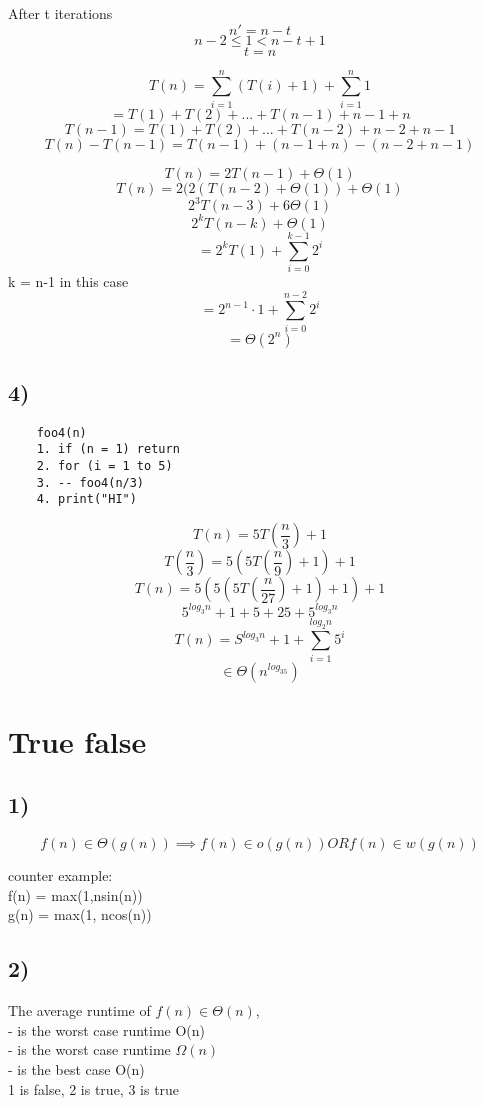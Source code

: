 \documentclass[12pt]{article}
\begin{document}
	After t iterations\\
	$$n' = n-t$$
	$$n-2 \leq 1 < n-t + 1$$
	$$t = n$$
	
	$$T(n) = \sum_{i = 1}^{n}(T(i) + 1) + \sum_{i = 1}^{n}1$$
	$$ = T(1) + T(2) + ... + T(n-1) + n - 1 + n$$
	$$T(n-1) = T(1) + T(2) + ... + T(n-2) + n-2 + n-1$$
	$$T(n) - T(n-1) = T(n-1) + (n-1+n) - (n - 2 + n - 1)$$
	
	$$T(n) = 2T(n-1) + \Theta(1)$$
	$$T(n) = 2(2(T(n-2) + \Theta(1)) + \Theta(1)$$
	$$2^3T(n-3) + 6\Theta(1)$$
	$$2^kT(n-k) + \Theta(1)$$
	$$= 2^kT(1) + \sum_{i=0}^{k-1}2^i$$
	k = n-1 in this case\\
	$$= 2^{n-1} \cdot 1 + \sum_{i=0}^{n-2}2^i$$
	$$= \Theta(2^n)$$
	
	\subsection*{4)}
	\begin{verbatim}
	foo4(n)
	1. if (n = 1) return
	2. for (i = 1 to 5)
	3. -- foo4(n/3)
	4. print("HI")
	\end{verbatim}
	
	$$T(n) = 5T(\frac{n}{3}) + 1$$
	$$T(\frac{n}{3}) = 5(5T(\frac{n}{9}) + 1) + 1$$
	$$T(n) = 5(5(5T(\frac{n}{27}) + 1) + 1) + 1$$
	$$5^{log_3n} + 1 + 5 + 25 + 5^{log_3n}$$
	$$T(n) = S^{log_3n} + 1 + \sum_{i = 1}^{log_2n}5^i$$
	$$\in \Theta(n^{log_35})$$
	
	\section*{True false}
	\subsection*{1)}
	$$f(n) \in \Theta(g(n)) \implies f(n) \in o(g(n)) OR f(n) \in w(g(n))$$
	
	counter example: \\
	f(n) = max(1,nsin(n))\\
	g(n) = max(1, ncos(n))\\
	
	\subsection*{2)}
	The average runtime of $f(n) \in \Theta(n)$,\\
	- is the worst case runtime O(n)\\
	- is the worst case runtime $\Omega(n)$\\
	- is the best case O(n)\\
	
	1 is false, 2 is true, 3 is true\\
	
	
	
	
\end{document}
